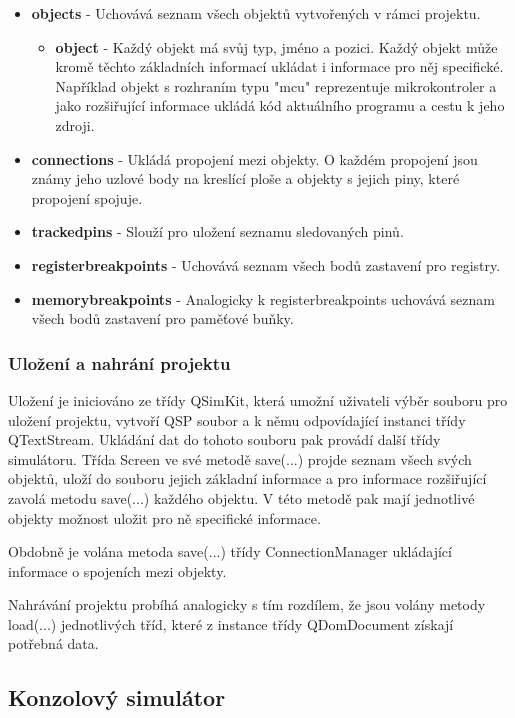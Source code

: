 \begin{itemize}
\item \textbf{objects} - Uchovává seznam všech objektů vytvořených v rámci projektu.
\begin{itemize}
\item \textbf{object} - Každý objekt má svůj typ, jméno a pozici. Každý objekt může kromě těchto základních informací ukládat i informace pro něj specifické. Například objekt s rozhraním typu "mcu" reprezentuje mikrokontroler a jako rozšiřující informace ukládá kód aktuálního programu a cestu k jeho zdroji.
\end{itemize}
\item \textbf{connections} - Ukládá propojení mezi objekty. O každém propojení jsou známy jeho uzlové body na kreslící ploše a objekty s jejich piny, které propojení spojuje.
\item \textbf{trackedpins} - Slouží pro uložení seznamu sledovaných pinů.
\item \textbf{registerbreakpoints} - Uchovává seznam všech bodů zastavení pro registry. 
\item \textbf{memorybreakpoints} - Analogicky k registerbreakpoints uchovává seznam všech bodů zastavení pro paměťové buňky.
\end{itemize}


\subsubsection{Uložení a nahrání projektu}

Uložení je iniciováno ze třídy QSimKit, která umožní uživateli výběr souboru pro uložení projektu, vytvoří QSP soubor a k němu odpovídající instanci třídy QTextStream. Ukládání dat do tohoto souboru pak provádí další třídy simulátoru. Třída Screen ve své metodě save(...) projde seznam všech svých objektů, uloží do souboru jejich základní informace a pro informace rozšiřující zavolá metodu save(...) každého objektu. V této metodě pak mají jednotlivé objekty možnost uložit pro ně specifické informace.

Obdobně je volána metoda save(...) třídy ConnectionManager ukládající informace o spojeních mezi objekty.

Nahrávání projektu probíhá analogicky s tím rozdílem, že jsou volány metody load(...) jednotlivých tříd, které z instance třídy QDomDocument získají potřebná data.

\subsection{Konzolový simulátor}

